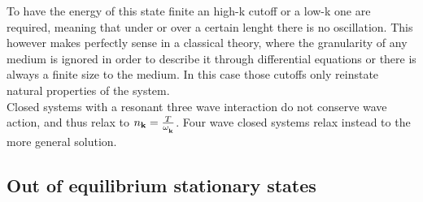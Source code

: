 To have the energy of this state finite an high-k cutoff or a low-k one are required, meaning that under or over a certain lenght there is no oscillation. This however makes perfectly sense in
a classical theory, where the granularity of any medium is ignored in order to describe it through differential equations or there is always a finite size to the medium. 
In this case those cutoffs only reinstate natural properties of the system.\\ 
Closed systems with a resonant three wave interaction do not conserve wave action, and thus relax to $n_\mathbf{k} = \frac{T}{\omega^{}_{\mathbf{k}}}$. 
Four wave closed systems relax instead to 
the more general solution. \\

\subsection{Out of equilibrium stationary states}

